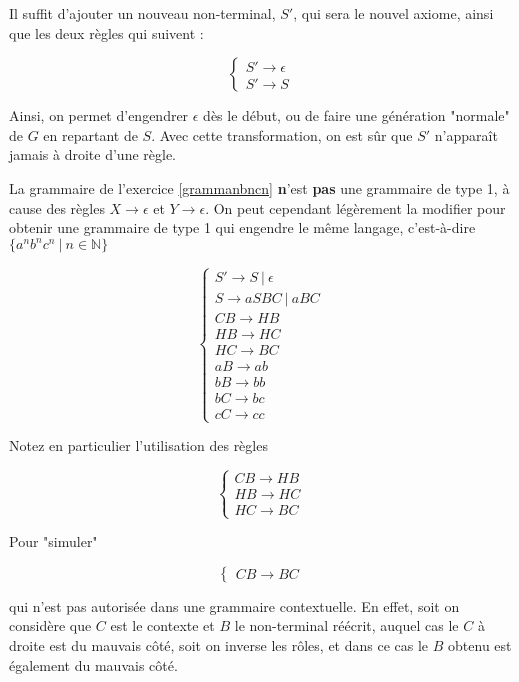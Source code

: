 Il suffit d'ajouter un nouveau non-terminal, $S'$, qui sera le nouvel axiome, ainsi que les deux règles qui suivent : 


\[
\begin{cases}
S' \rightarrow \epsilon \\
S' \rightarrow S
\end{cases}
\]

Ainsi, on permet d'engendrer $\epsilon$ dès le début, ou de faire une génération "normale" de $G$ en repartant de $S$. Avec cette transformation, on est sûr que $S'$ n'apparaît jamais à droite d'une règle.

\begin{example}
\label{grammanbncnbis}
La grammaire de l'exercice \ref{grammanbncn} \textbf{n}'est \textbf{pas} une grammaire de type 1, à cause des règles $X \rightarrow \epsilon$ et $Y \rightarrow \epsilon$. On peut cependant légèrement la modifier pour obtenir une grammaire de type 1 qui engendre le même langage, c'est-à-dire $\{a^nb^nc^n ~|~ n \in \mathbb{N}\}$


\[
\begin{cases}
S' \rightarrow S~|~\epsilon\\
S \rightarrow aSBC~|~aBC \\
CB \rightarrow HB\\
HB \rightarrow HC \\
HC \rightarrow BC \\
aB \rightarrow ab \\
bB \rightarrow bb \\
bC \rightarrow bc \\
cC \rightarrow cc 
\end{cases}
\]

Notez en particulier l'utilisation des règles 

\[
\begin{cases}
CB \rightarrow HB\\
HB \rightarrow HC \\
HC \rightarrow BC 
\end{cases}
\]

Pour "simuler"

\[
\begin{cases}
CB \rightarrow BC
\end{cases}
\]

qui n'est pas autorisée  dans une grammaire contextuelle. En effet, soit on considère que $C$ est le contexte et $B$ le non-terminal réécrit, auquel cas le $C$ à droite est du mauvais côté, soit on inverse les rôles, et dans ce cas le $B$ obtenu est également du mauvais côté.

\end{example}

